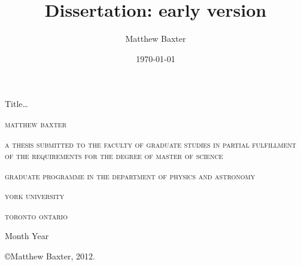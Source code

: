 \documentclass[letterpaper, 11 pt]{report}
\title{Dissertation: early version}
\author{Matthew Baxter}
\date{\today}
\begin{document}

\begin{titlepage} %

   \centering
   
   {\Large Title\dots}
   
   \vspace{2 cm}
   
   \textsc{matthew baxter}
   
   \vspace{2 cm}
   
   \textsc{a thesis submitted to the faculty of graduate studies in partial fulfillment of the
           requirements for the degree of master of science}
   
   \vspace{2 cm}
   
   \textsc{graduate programme in the department of physics and astronomy}
   
   \textsc{york university}
   
   \textsc{toronto ontario}
   
   Month Year
   
   \vspace{3.5 cm}
   
   \copyright Matthew Baxter, 2012.   

   \thispagestyle{empty}

\end{titlepage}

\cleardoublepage
{}
{}

\begin{abstract}
   
   \thispagestyle{plain}
   \setcounter{page}{2}

\end{abstract}

\setcounter{page}{3}

\cleardoublepage
{}
{}
\tableofcontents

\cleardoublepage
{}
{}
\listoftables

\cleardoublepage
{}
{}
\listoffigures

\newpage


\onehalfspacing  %
\end{document}
